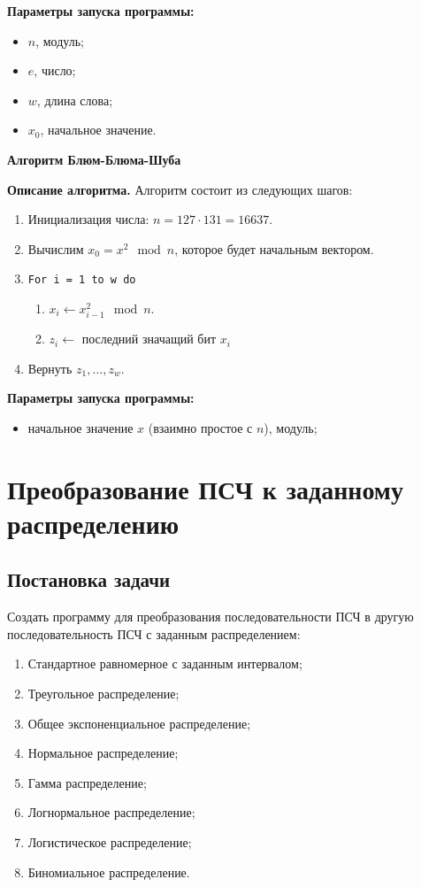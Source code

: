 \documentclass[spec, och, labwork]{shiza}
\begin{document}
\textbf{Параметры запуска программы:}
\begin{itemize}
  \item $n$, модуль;
  \item $e$, число;
  \item $w$, длина слова;
  \item $x_0$, начальное значение.
\end{itemize}

\begin{center}
  \textbf{Алгоритм Блюм-Блюма-Шуба}
\end{center}
\textbf{Описание алгоритма.} Алгоритм состоит из следующих шагов:
\begin{enumerate}
  \item Инициализация числа: $n = 127 \cdot 131 = 16637$.
  \item Вычислим $x_0 = x^2 \mod n$, которое будет начальным вектором.
  \item \texttt{For i = 1 to w do}
        \begin{enumerate}
          \item $x_i \leftarrow x_{i-1}^2 \mod n$.
          \item $z_i \leftarrow $ последний значащий бит $x_i$
        \end{enumerate}
  \item Вернуть $z_1, \dots, z_w$.
\end{enumerate}

\textbf{Параметры запуска программы:}
\begin{itemize}
  \item начальное значение $x$ (взаимно простое с $n$), модуль;
\end{itemize}

\section{Преобразование ПСЧ к заданному распределению}
\subsection{Постановка задачи}
Создать программу для преобразования последовательности ПСЧ в другую последовательность
ПСЧ с заданным распределением:
\begin{enumerate}
  \item Стандартное равномерное с заданным интервалом;
  \item Треугольное распределение;
  \item Общее экспоненциальное распределение;
  \item Нормальное распределение;
  \item Гамма распределение;
  \item Логнормальное распределение;
  \item Логистическое распределение;
  \item Биномиальное распределение.
\end{enumerate}
\end{document}

